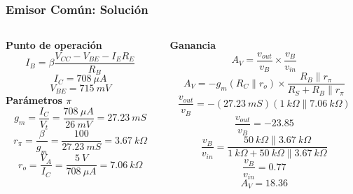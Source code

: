 \begin{frame}[t]
    \frametitle{Emisor Común: Solución}

    \begin{columns}
        \begin{column}{0.5\textwidth}
            \textbf{Punto de operación}
            \[ I_B = \beta \dfrac{V_{CC}-V_{BE}-I_E R_E}{R_B} \]
            \[ I_C = 708\ \mu A \]
            \[ V_{BE} = 715\ mV \]
            \vspace{3mm}
            \textbf{Parámetros $\pi$}
            \[ g_m = \dfrac{I_C}{V_t} = \dfrac{708\ \mu A}{26\ mV} = \boxed{27.23\ mS} \]
            \[ r_\pi = \dfrac{\beta}{g_m} = \dfrac{100}{27.23\ mS} = \boxed{3.67\ k\Omega} \]
            \[ r_o = \dfrac{V_A}{I_C} = \dfrac{5\ V}{708\ \mu A} = \boxed{7.06\ k\Omega} \]
        \end{column}
        \begin{column}{0.5\textwidth}
            \textbf{Ganancia}
            \[ A_V = \dfrac{v_{out}}{v_B}\times{}\dfrac{v_B}{v_{in}} \]
            \[ A_V = -g_m (R_C \parallel r_o) \times{}\dfrac{R_B\parallel r_\pi}{R_S+R_B\parallel r_\pi} \]
            \[ \dfrac{v_{out}}{v_B} = -(27.23\ mS) (1\ k\Omega \parallel 7.06\ k\Omega) \]
            \[ \dfrac{v_{out}}{v_B} = -23.85 \]
            \[ \dfrac{v_B}{v_{in}} = \dfrac{50\ k\Omega \parallel 3.67\ k\Omega}{1\ k\Omega+50\ k\Omega \parallel 3.67\ k\Omega} \]
            \[ \dfrac{v_B}{v_{in}} = 0.77 \]
            \[ \boxed{A_V = 18.36} \]
        \end{column}
    \end{columns}
\end{frame}


